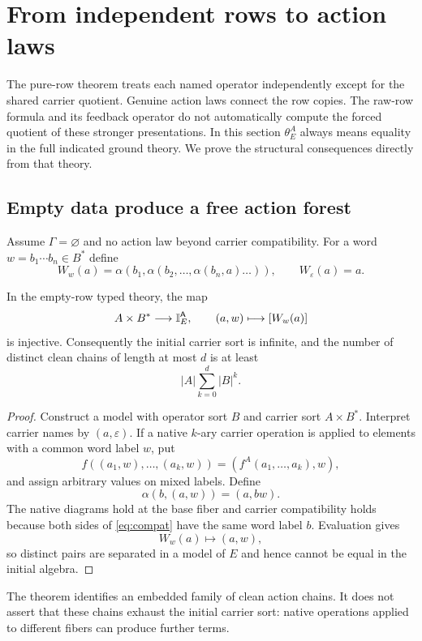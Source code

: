 \section{From independent rows to action laws}\label{sec:actionlaws}

The pure-row theorem treats each named operator independently except for the shared carrier quotient.  Genuine action laws connect the row copies.  The raw-row formula and its feedback operator do not automatically
compute the forced quotient of these stronger presentations. In this
section $\theta_E^A$ always means equality in the full indicated ground
theory. We prove the structural consequences directly from that theory.

\subsection{Empty data produce a free action forest}

Assume $\Gamma=\varnothing$ and no action law beyond carrier compatibility.  For a word $w=b_1\cdots b_n\in B^*$ define
\[
W_w(a)
=
\alpha(b_1,\alpha(b_2,\ldots,\alpha(b_n,a)\ldots)),
\qquad
W_\varepsilon(a)=a.
\]

\begin{theorem}\label{thm:forest}
In the empty-row typed theory, the map
\[
A\times B^*\longrightarrow \mathbb I_E^{\mathsf{A}},
\qquad
(a,w)\longmapsto[W_w(a)]
\]
is injective.  Consequently the initial carrier sort is infinite, and the number of distinct clean chains of length at most $d$ is at least
\[
|A|\sum_{k=0}^d|B|^k.
\]
\end{theorem}

\begin{proof}
Construct a model with operator sort $B$ and carrier sort $A\times B^*$.  Interpret carrier names by $(a,\varepsilon)$.  If a native $k$-ary carrier operation is applied to elements with a common word label $w$, put
\[
f((a_1,w),\ldots,(a_k,w))=(f^A(a_1,\ldots,a_k),w),
\]
and assign arbitrary values on mixed labels.  Define
\[
\alpha(b,(a,w))=(a,bw).
\]
The native diagrams hold at the base fiber and carrier compatibility holds because both sides of \eqref{eq:compat} have the same word label $b$.  Evaluation gives
\[
W_w(a)\mapsto(a,w),
\]
so distinct pairs are separated in a model of $E$ and hence cannot be equal in the initial algebra.
\end{proof}

The theorem identifies an embedded family of clean action chains.
It does not assert that these chains exhaust the initial carrier sort:
native operations applied to different fibers can produce further terms.

